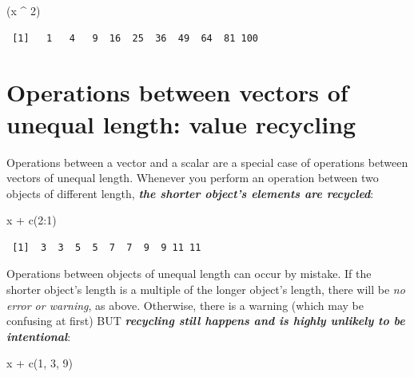 \documentclass[
]{book}
\newenvironment{Shaded}{\begin{snugshade}}{\end{snugshade}}
\newcommand{\DecValTok}[1]{\textcolor[rgb]{0.00,0.00,0.81}{#1}}
\newcommand{\FunctionTok}[1]{\textcolor[rgb]{0.00,0.00,0.00}{#1}}
\newcommand{\NormalTok}[1]{#1}
\newcommand{\SpecialCharTok}[1]{\textcolor[rgb]{0.00,0.00,0.00}{#1}}
\begin{document}
\begin{Shaded}
\begin{Highlighting}[]
\NormalTok{(x }\SpecialCharTok{\^{}} \DecValTok{2}\NormalTok{)}
\end{Highlighting}
\end{Shaded}

\begin{verbatim}
 [1]   1   4   9  16  25  36  49  64  81 100
\end{verbatim}

\hypertarget{operations-between-vectors-of-unequal-length-value-recycling}{%
\section{\texorpdfstring{Operations between vectors of unequal length: \textbf{value recycling}}{Operations between vectors of unequal length: value recycling}}\label{operations-between-vectors-of-unequal-length-value-recycling}}

Operations between a vector and a scalar are a special case of operations between vectors of unequal length. Whenever you perform an operation between two objects of different length, \textbf{\emph{the shorter object's elements are recycled}}:

\begin{Shaded}
\begin{Highlighting}[]
\NormalTok{x }\SpecialCharTok{+} \FunctionTok{c}\NormalTok{(}\DecValTok{2}\SpecialCharTok{:}\DecValTok{1}\NormalTok{)}
\end{Highlighting}
\end{Shaded}

\begin{verbatim}
 [1]  3  3  5  5  7  7  9  9 11 11
\end{verbatim}

\begin{Warning}
Operations between objects of unequal length can occur by mistake. If
the shorter object's length is a multiple of the longer object's length,
there will be \emph{no error or warning}, as above. Otherwise, there is
a warning (which may be confusing at first) BUT \textbf{\emph{recycling
still happens and is highly unlikely to be intentional}}:
\end{Warning}

\begin{Shaded}
\begin{Highlighting}[]
\NormalTok{x }\SpecialCharTok{+} \FunctionTok{c}\NormalTok{(}\DecValTok{1}\NormalTok{, }\DecValTok{3}\NormalTok{, }\DecValTok{9}\NormalTok{)}
\end{Highlighting}
\end{Shaded}
\end{document}
